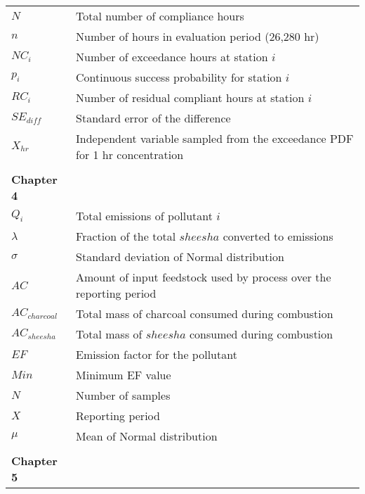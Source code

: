 \begin{longtable}{ll}
$N$ & Total number of compliance hours \\
$n$ & Number of hours in evaluation period (26,280 hr) \\
$NC_{i}$ & Number of exceedance hours at station $i$ \\
$p_{i}$ & Continuous success probability for station $i$ \\
$RC_{i}$ & Number of residual compliant hours at station $i$ \\
$SE_{diff}$ & Standard error of the difference \\
$X_{hr}$ & Independent variable sampled from the exceedance PDF for 1 hr concentration \\
\\
\bigskip

\textbf{Chapter 4}\\

$Q_{i}$ & Total emissions of pollutant $i$ \\
$\lambda$ & Fraction of the total $sheesha$ converted to emissions \\
$\sigma$ & Standard deviation of Normal distribution \\
$AC$ & Amount of input feedstock used by process over the reporting period \\
$AC_{charcoal}$ & Total mass of charcoal consumed during combustion \\
$AC_{sheesha}$ & Total mass of $sheesha$ consumed during combustion \\
$EF$ & Emission factor for the pollutant \\
$Min$ & Minimum EF value \\
$N$ & Number of samples \\
$X$ & Reporting period \\
$\mu$ & Mean of Normal distribution\\
\\
\bigskip

\textbf{Chapter 5}\\


\end{longtable}
